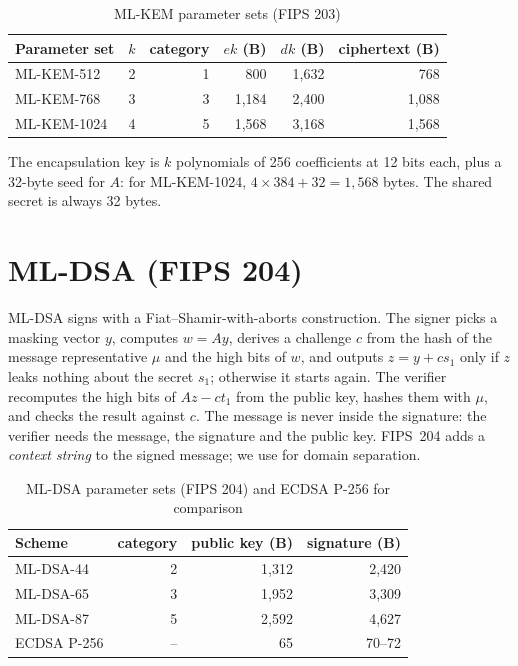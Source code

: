 \begin{table}[h]
\centering
\caption{ML-KEM parameter sets (FIPS 203)}
\label{tab:mlkem}
\begin{tabular}{lrrrrr}
\toprule
Parameter set & $k$ & category & $ek$ (B) & $dk$ (B) & ciphertext (B) \\
\midrule
ML-KEM-512 & 2 & 1 & 800 & 1,632 & 768 \\
ML-KEM-768 & 3 & 3 & 1,184 & 2,400 & 1,088 \\
ML-KEM-1024 & 4 & 5 & 1,568 & 3,168 & 1,568 \\
\bottomrule
\end{tabular}
\end{table}

The encapsulation key is $k$ polynomials of 256 coefficients at 12 bits each,
plus a 32-byte seed for $A$: for ML-KEM-1024, $4 \times 384 + 32 = 1{,}568$
bytes. The shared secret is always 32 bytes.

\section{ML-DSA (FIPS 204)}

ML-DSA signs with a Fiat--Shamir-with-aborts construction. The signer picks a
masking vector $y$, computes $w = Ay$, derives a challenge $c$ from the hash of
the message representative $\mu$ and the high bits of $w$, and outputs $z = y
+ cs_1$ only if $z$ leaks nothing about the secret $s_1$; otherwise it starts
again. The verifier recomputes the high bits of $Az - ct_1$ from the public
key, hashes them with $\mu$, and checks the result against $c$. The message is
never inside the signature: the verifier needs the message, the signature and
the public key. FIPS~204 adds a \emph{context string} to the signed message;
we use  for domain separation.

\begin{table}[h]
\centering
\caption{ML-DSA parameter sets (FIPS 204) and ECDSA P-256 for comparison}
\label{tab:mldsa}
\begin{tabular}{lrrr}
\toprule
Scheme & category & public key (B) & signature (B) \\
\midrule
ML-DSA-44 & 2 & 1,312 & 2,420 \\
ML-DSA-65 & 3 & 1,952 & 3,309 \\
ML-DSA-87 & 5 & 2,592 & 4,627 \\
ECDSA P-256 & -- & 65 & 70--72 \\
\bottomrule
\end{tabular}
\end{table}

